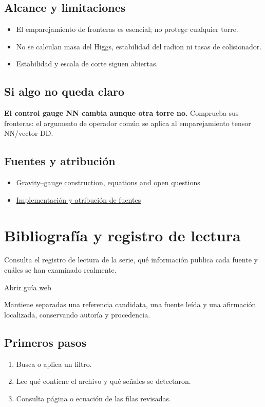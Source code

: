 \documentclass[11pt,a4paper]{article}
\begin{document}
\subsection*{Alcance y limitaciones}
\begin{itemize}
\item El emparejamiento de fronteras es esencial; no protege cualquier torre.
\item No se calculan masa del Higgs, estabilidad del radion ni tasas de colisionador.
\item Estabilidad y escala de corte siguen abiertas.
\end{itemize}
\subsection*{Si algo no queda claro}
\textbf{El control gauge NN cambia aunque otra torre no.} Comprueba sus fronteras: el argumento de operador común se aplica al emparejamiento tensor NN/vector DD.

\subsection*{Fuentes y atribución}
\begin{itemize}
\item \href{https://github.com/karlesmarin/ghu-lab/blob/main/src/modules/gravitygauge.mjs}{Gravity--gauge construction, equations and open questions}
\item \href{https://github.com/karlesmarin/ghu-lab/blob/main/src/sections/gravitygauge_section.js}{Implementación y atribución de fuentes}
\end{itemize}
\section{Bibliografía y registro de lectura}
Consulta el registro de lectura de la serie, qué información publica cada fuente y cuáles se han examinado realmente.

\href{https://karlesmarin.github.io/ghu-explorer/guide/es/litcensus/index.html}{Abrir guía web}

Mantiene separadas una referencia candidata, una fuente leída y una afirmación localizada, conservando autoría y procedencia.
\subsection*{Primeros pasos}
\begin{enumerate}
\item Busca o aplica un filtro.
\item Lee qué contiene el archivo y qué señales se detectaron.
\item Consulta página o ecuación de las filas revisadas.
\end{enumerate}
\end{document}
